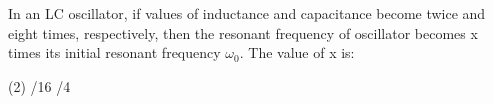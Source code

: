 \item In an LC oscillator, if values of inductance and capacitance become twice and eight times, respectively, then the resonant frequency of oscillator becomes x times its initial resonant frequency \(\omega_0\). The value of x is:
    \begin{tasks}(2)
        /16
        /4
    \end{tasks}